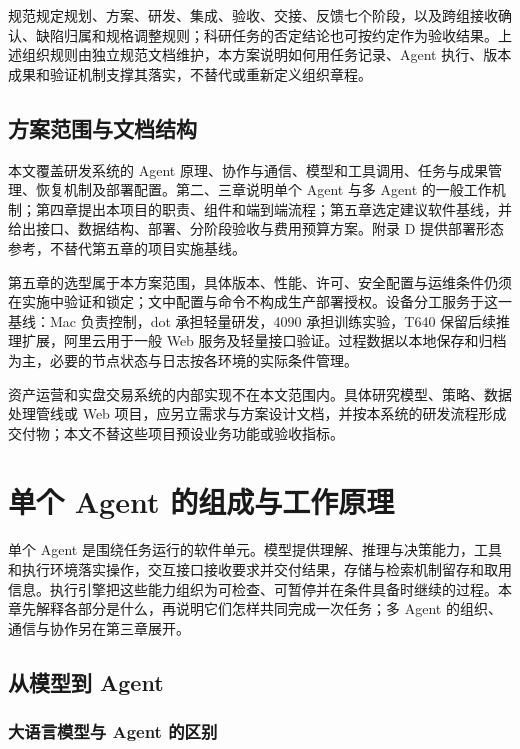 \documentclass[11pt,a4paper]{article}
\begin{document}
规范规定规划、方案、研发、集成、验收、交接、反馈七个阶段，以及跨组接收确认、缺陷归属和规格调整规则；科研任务的否定结论也可按约定作为验收结果。上述组织规则由独立规范文档维护，本方案说明如何用任务记录、Agent 执行、版本成果和验证机制支撑其落实，不替代或重新定义组织章程。

\subsection{方案范围与文档结构}

本文覆盖研发系统的 Agent 原理、协作与通信、模型和工具调用、任务与成果管理、恢复机制及部署配置。第二、三章说明单个 Agent 与多 Agent 的一般工作机制；第四章提出本项目的职责、组件和端到端流程；第五章选定建议软件基线，并给出接口、数据结构、部署、分阶段验收与费用预算方案。附录 D 提供部署形态参考，不替代第五章的项目实施基线。

第五章的选型属于本方案范围，具体版本、性能、许可、安全配置与运维条件仍须在实施中验证和锁定；文中配置与命令不构成生产部署授权。设备分工服务于这一基线：Mac 负责控制，dot 承担轻量研发，4090 承担训练实验，T640 保留后续推理扩展，阿里云用于一般 Web 服务及轻量接口验证。过程数据以本地保存和归档为主，必要的节点状态与日志按各环境的实际条件管理。

资产运营和实盘交易系统的内部实现不在本文范围内。具体研究模型、策略、数据处理管线或 Web 项目，应另立需求与方案设计文档，并按本系统的研发流程形成交付物；本文不替这些项目预设业务功能或验收指标。

\section{单个 Agent 的组成与工作原理}
\label{sec:single-agent}

单个 Agent 是围绕任务运行的软件单元。模型提供理解、推理与决策能力，工具和执行环境落实操作，交互接口接收要求并交付结果，存储与检索机制留存和取用信息。执行引擎把这些能力组织为可检查、可暂停并在条件具备时继续的过程。本章先解释各部分是什么，再说明它们怎样共同完成一次任务；多 Agent 的组织、通信与协作另在第三章展开。

\subsection{从模型到 Agent}
\label{sec:single-agent-concepts}

\subsubsection{大语言模型与 Agent 的区别}
\end{document}
